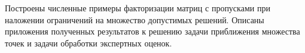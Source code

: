 \documentclass[specialist,
               substylefile = spbu.rtx,
               subf,href,colorlinks=true, 12pt]{disser}
\theoremstyle{definition}
\begin{document}
\begin{itemize}
Построены численные примеры факторизации матриц с пропусками при наложении ограничений на множество допустимых решений. 
Описаны приложения полученных результатов к решению задачи приближения множества точек и задачи обработки экспертных оценок. 
\end{itemize}



\end{document}

